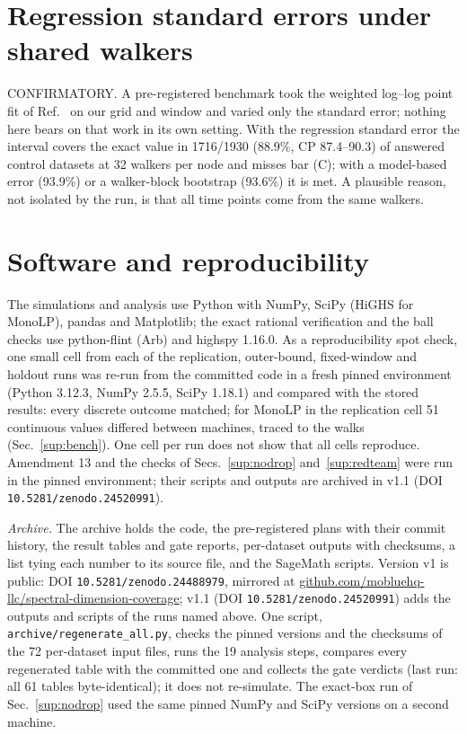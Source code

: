 \documentclass[aps,pre,twocolumn,superscriptaddress,nofootinbib,10pt]{revtex4-2}
\begin{document}
\section{Regression standard errors under shared walkers}\label{sup:gk}
CONFIRMATORY. A pre-registered benchmark took the weighted log--log point fit of Ref.~\cite{gk2022} on our grid and window and varied only the standard error; nothing here bears on that work in its own setting. With the regression standard error the interval covers the exact value in 1716/1930 (88.9\%, CP 87.4--90.3) of answered control datasets at 32 walkers per node and misses bar (C); with a model-based error (93.9\%) or a walker-block bootstrap (93.6\%) it is met. A plausible reason, not isolated by the run, is that all time points come from the same walkers.

\section{Software and reproducibility}\label{sup:soft}
The simulations and analysis use Python with NumPy, SciPy (HiGHS for \textsf{MonoLP}), pandas and Matplotlib; the exact rational verification and the ball checks use python-flint (Arb) and highspy 1.16.0. As a reproducibility spot check, one small cell from each of the replication, outer-bound, fixed-window and holdout runs was re-run from the committed code in a fresh pinned environment (Python 3.12.3, NumPy 2.5.5, SciPy 1.18.1) and compared with the stored results: every discrete outcome matched; for \textsf{MonoLP} in the replication cell 51 continuous values differed between machines, traced to the walks (Sec.~\ref{sup:bench}). One cell per run does not show that all cells reproduce. Amendment 13 and the checks of Secs.~\ref{sup:nodrop} and~\ref{sup:redteam} were run in the pinned environment; their scripts and outputs are archived in v1.1 (DOI \texttt{10.5281/zenodo.24520991}).

\emph{Archive.} The archive holds the code, the pre-registered plans with their commit history, the result tables and gate reports, per-dataset outputs with checksums, a list tying each number to its source file, and the SageMath scripts. Version v1 is public: DOI \texttt{10.5281/zenodo.24488979}, mirrored at {\footnotesize\mbox{\url{github.com/mobluehq-llc/spectral-dimension-coverage}}}; v1.1 (DOI \texttt{10.5281/zenodo.24520991}) adds the outputs and scripts of the runs named above. One script, \texttt{archive/regenerate\_all.py}, checks the pinned versions and the checksums of the 72 per-dataset input files, runs the 19 analysis steps, compares every regenerated table with the committed one and collects the gate verdicts (last run: all 61 tables byte-identical); it does not re-simulate. The exact-box run of Sec.~\ref{sup:nodrop} used the same pinned NumPy and SciPy versions on a second machine.


\end{document}
